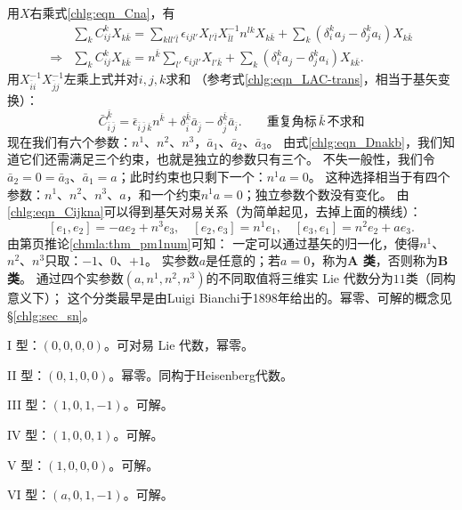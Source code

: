 用$X$右乘式\eqref{chlg:eqn_Cna}，有
\begin{align*}
	&\sum\nolimits_{k} C^k_{ij} X_{k \bar{k}}
	= \sum\nolimits_{kl l'\bar{l}} \epsilon_{ijl'} X_{l' \bar{l}} X^{-1}_{\bar{l}l} n^{lk} X_{k \bar{k}} 
	+\sum\nolimits_{k} (\delta^k_i a_j - \delta^k_j a_i ) X_{k \bar{k}} \\
	\Rightarrow & \sum\nolimits_{k} C^k_{ij} X_{k \bar{k}}
	= n^{\bar{k}}  \sum\nolimits_{ l'}  \epsilon_{ijl'}  X_{l' \bar{k}} 
	+\sum\nolimits_{k} (\delta^k_i a_j - \delta^k_j a_i ) X_{k \bar{k}} .
\end{align*}
用$X^{-1}_{\bar{i}i}X^{-1}_{\bar{j}j}$左乘上式并对$i,j,k$求和
（参考式\eqref{chlg:eqn_LAC-trans}，相当于基矢变换）：
\begin{equation}\label{chlg:eqn_Cijkna}
		\bar{C}^{\bar{k}}_{\bar{i}\,\bar{j}} = \bar{\epsilon}_{\bar{i}\,\bar{j}\,\bar{k}} n^{\bar{k}} 
		+\delta^{\bar{k}}_{\bar{i}} \bar{a}_{\bar{j}} - \delta^{\bar{k}}_{\bar{j}} \bar{a}_{\bar{i}}  .
		\qquad \text{重复角标}\,\bar{k}\,\text{不求和}
\end{equation}
现在我们有六个参数：$n^1$、$n^2$、$n^3$，$\bar{a}_1$、$\bar{a}_2$、$\bar{a}_3$。
由式\eqref{chlg:eqn_Dnakb}，我们知道它们还需满足三个约束，也就是独立的参数只有三个。
不失一般性，我们令$\bar{a}_2=0=\bar{a}_3$、$\bar{a}_1=a$；此时约束也只剩下一个：$n^1 a =0$。
这种选择相当于有四个参数：$n^1$、$n^2$、$n^3$、$a$，和一个约束$n^1 a =0$；独立参数个数没有变化。
由\eqref{chlg:eqn_Cijkna}可以得到基矢对易关系（为简单起见，去掉上面的横线）：
\begin{equation}\label{chlg:eqn_G3-bc}
	[e_1,e_2]=-a e_2 + n^3 e_3,\quad
	[e_2,e_3]= n^1 e_1,\quad
	[e_3,e_1]=n^2 e_2 + a e_3 .
\end{equation}
由第\pageref{chmla:thm_pm1num}页推论\ref{chmla:thm_pm1num}可知：
一定可以通过基矢的归一化，使得$n^1$、$n^2$、$n^3$只取：$-1$、$0$、$+1$。
实参数$a$是任意的；若$a=0$，称为{\bfseries\heiti A 类}，否则称为{\bfseries\heiti B 类}。
通过四个实参数$(a,n^1,n^2,n^3)$的不同取值将三维实 Lie 代数分为$11$类（同构意义下）；
这个分类最早是由Luigi Bianchi于1898年给出的。幂零、可解的概念见\S\ref{chlg:sec_sn}。

{I 型}：$(0,0,0,0)$。可对易 Lie 代数，幂零。

{II 型}：$(0,1,0,0)$。幂零。同构于Heisenberg代数。

{III 型}：$(1,0,1,-1)$。可解。

{IV 型}：$(1,0,0,1)$。可解。

{V 型}：$(1,0,0,0)$。可解。

{VI 型}：$(a,0,1,-1)$。可解。

